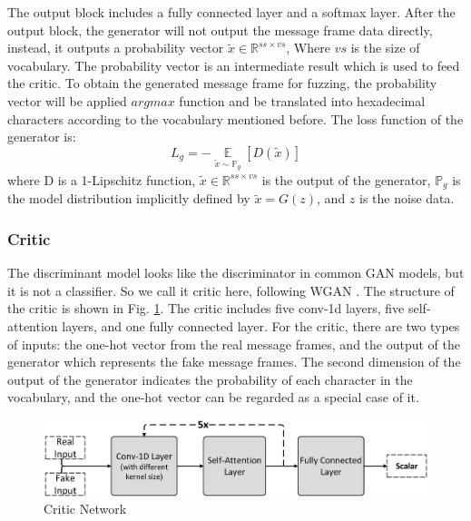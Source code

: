 The output block includes a fully connected layer and a softmax layer. After the output block, the generator will not output the message frame data directly, instead, it outputs a probability vector $\tilde{x} \in \mathbb{R}^{ss \times vs}$, Where ${vs}$ is the size of vocabulary. %
The probability vector is an intermediate result which is used to feed the critic. To obtain the generated message frame for fuzzing, the probability vector will be applied $argmax$ function and be translated into hexadecimal characters according to the vocabulary mentioned before. The loss function of the generator is:
\begin{equation}
L_{g} = - \mathop{\mathbb{E}}\limits_{\tilde{x}\sim\mathbb{P}_{g}}\left [ D(\tilde{x}) \right ] 
\end{equation}
where D is a 1-Lipschitz function, $\tilde{x} \in \mathbb{R}^{ss \times vs}$ is the output of the generator, $\mathbb{P}_g$ is the model distribution implicitly defined by $\tilde{x}=G(z)$, and $z$ is the noise data.

\subsubsection{\textbf{Critic}}

The discriminant model looks like the discriminator in common GAN models, but it is not a classifier. So we call it critic here, following WGAN \cite{arjovsky2017wasserstein}. The structure of the critic is shown in Fig. \ref{FigHexGANFuzzer_Critic}. The critic includes five conv-1d layers, five self-attention layers, and one fully connected layer. For the critic, there are two types of inputs: the one-hot vector from the real message frames, and the output of the generator which represents the fake message frames. 
The second dimension of the output of the generator indicates the probability of each character in the vocabulary, and the one-hot vector can be regarded as a special case of it. %

\begin{figure}[htbp]   %
	\centering 
	\includegraphics[width=\textwidth]{Figure/FigHexGANFuzzer_Critic.eps}
	\caption{Critic Network}
	\label{FigHexGANFuzzer_Critic}
\end{figure}

